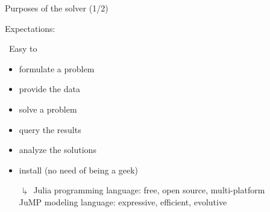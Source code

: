 \documentclass[]{beamer}
\newcommand*{\blue}[1]{\textcolor{nblue}{#1}}
\begin{document}
% 
%
\begin{frame}{Purposes of {the solver} (1/2)}

Expectations:\vspace{3mm}

\ \blue{Easy}  to
\begin{itemize}
    
    \item formulate a problem
    \item provide the data
    \item solve a problem  
    \item query the results
    \item analyze the solutions \vspace{3mm}
    \item install (no need of being a geek)
\end{itemize}    
\vspace{5mm}
\pause

\begin{itemize}
\item[$\drsh$] 
\blue{Julia} programming language: free, open source, multi-platform  \vspace{1mm} \\
%
\blue{JuMP}  modeling language: expressive, efficient, evolutive  
\end{itemize}            
      \bigskip

%
%


\end{frame}
\end{document}
